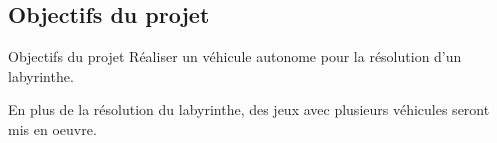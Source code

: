 \documentclass{beamer}
\begin{document}
\subsection{Objectifs du projet}
\begin{frame}{Objectifs du projet}
Réaliser un véhicule autonome pour la résolution d'un labyrinthe. 

\vspace{5mm}

\begin{center}
    
\begin{table}[H]
    \caption{Objectifs à réaliser pour les trois parties essentielles}
\end{table}

\end{center}

En plus de la résolution du labyrinthe, des jeux avec plusieurs véhicules seront mis en oeuvre.
\end{frame}
\end{document}
